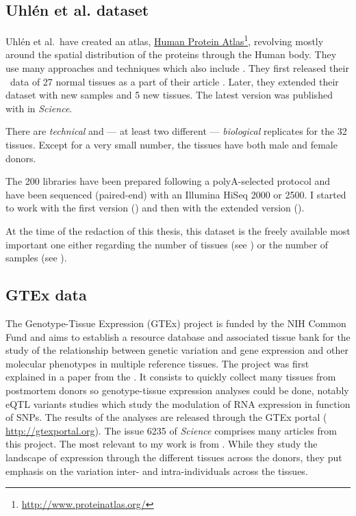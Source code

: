 \subsection{Uhlén et al. dataset}

Uhlén et al.\ have created an atlas,
\href{http://www.proteinatlas.org/}{Human Protein Atlas}\footnote{%
\href{http://www.proteinatlas.org/}{http://www.proteinatlas.org/}},
revolving mostly around the spatial
distribution of the proteins through the Human body. They use many approaches
and techniques which also include \Rnaseq. They first released their \Rnaseq\
data of 27 normal tissues as a part of their article 
\citep{Uhlen2014}. Later, they extended their dataset with new samples and 5 new
tissues. The latest version was published with \paper{\citetitle{Uhlen2015}}
\citep{Uhlen2015} in \textit{Science}.

There are \emph{technical} and --- at least two different --- \emph{biological}
replicates for the 32 tissues.
Except for a very small number, the tissues have both male and female donors.

The 200 libraries have been prepared following a polyA-selected protocol and
have been sequenced (paired-end) with an Illumina HiSeq 2000 or 2500. I started
to work with the first version (\ArrayExpress{E-MTAB-1733}) and then
with the extended version (\ArrayExpress{E-MTAB-2836}).

At the time of the redaction of this thesis, this dataset is the freely available
most important one either regarding the number of tissues
(see ) or the number of samples (see ).


\subsection{GTEx data}

The Genotype-Tissue Expression (\gls{GTEx}) project is funded by the \gls{NIH}
Common Fund and aims to establish a resource database and associated tissue bank
for the study of the relationship between genetic variation and gene expression
and other molecular phenotypes in multiple reference tissues. The project was first
explained in a paper from the \cite{GTEx2013}. It consists to quickly collect
many tissues from postmortem donors so genotype-tissue expression analyses could
be done, notably \gls{eQTL} variants studies which study the modulation
of \gls{RNA} expression in function of \glspl{SNP}. The results of the
analyses are released through the GTEx portal (%
\href{http://gtexportal.org}{http://gtexportal.org}). The issue 6235 of
\emph{Science} comprises
many articles from this project. The most relevant to my work is
\paper{\citetitle{GTExTranscript}} from \cite{GTExTranscript}. While they study
the landscape of expression through the different tissues across the donors, they
put emphasis on the variation inter- and intra-individuals across the tissues.

